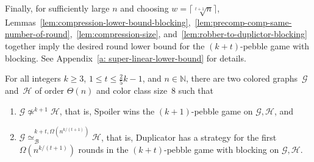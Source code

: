 \documentclass[a4paper,english, thm-restate]{lipics-v2021}
\newcommand{\comp}{\equiv}
\newcommand{\CFIsym}{\mathsf{CFI}}
\newcommand{\CFI}[1]{\CFIsym(#1)}
\newcommand{\compCFI}[2]{\CFI{#1}/_{#2}}
\newcommand{\nat}{\mathbb{N}}
\newcommand{\FF}{\mathbb{F}}
\newcommand{\graphG}{\mathcal{G}}
\newcommand{\graphH}{\mathcal{H}}
\newcommand{\edgeC}{E_{\mathcal{C}}}
\newcommand{\kbequivr}[2]{\simeq_{\mathcal{B}}^{#1,#2}}
\newcommand{\notkequiv}[1]{\not\simeq^{#1}}
\newcommand{\confORfull}[2]{#1}
\newcommand{\ifAppendix}[1]{#1}
\begin{document}
\noindent Finally, for sufficiently large $n$ and choosing $w = \lceil\sqrt[t+1]{n} \rceil$,
Lemmas~\ref{lem:compression-lower-bound-blocking},~\ref{lem:precomp-comp-same-number-of-round},~\ref{lem:compression-size}, and~\ref{lem:robber-to-duplictor-blocking}
together imply the desired round lower bound for 
the $(k+t)$-pebble game with blocking. \ifAppendix{See Appendix~\ref{a: super-linear-lower-bound} for details.}
%
\begin{theorem}
        \label{thm:compression-blocking-summary}
        For all integers $k\geq 3$, $1\leq t \leq \frac{2}{5}k-1$, and $n\in \nat$,
        there are  
        two colored graphs~$\graphG$ and~$\graphH$ of order $\Theta(n)$ and color class size~$8$
        such that
        \begin{enumerate}
                \item $\graphG \notkequiv{k+1} \graphH$, that is, Spoiler wins the $(k+1)$-pebble game on $\graphG, \graphH$,
                and 
                \item $\graphG \kbequivr{k+t}{\Omega(n^{k/(t+1)})} \graphH $,
                that is, Duplicator has a strategy for the first $\Omega(n^{k/(t+1)})$
                rounds in the $(k+t)$-pebble game with blocking on $\graphG, \graphH$.
        \end{enumerate}
\end{theorem}
\confORfull{}{
\begin{proof}
        Let $k \geq 3$, $1\leq t \leq  \frac{2}{5}k-1$, and $n \in \nat$.
        If $n$ is sufficiently large,
        for $w = \lceil\sqrt[t+1]{n} \rceil$ the required pairwise coprime numbers $p_1,\dots, p_k$ exist~\cite{DBLP:conf/focs/GroheLNS23}.
        Let $J = f(k) p_1\cdot\ldots \cdot p_k$
        and $\mathcal{C}$ be the $k\times J$ cylindrical grid.
        Also, let $\comp^t$ be the compression defined earlier with respect
        to $p_1,\dots, p_k$.
        By Lemma~\ref{lem:compression-lower-bound-blocking},
        the robber has a strategy for the first $\Omega( J) = \Omega(w^k) = \Omega(n^{k/(t+1)})$
        rounds in the compressed and blocking $(k+t)$-Cops and Robber game
        on $\mathcal{C}$ and $\comp^t$, when the robber is placed on the left or right end. 
        
        Now let $e$ be an edge in the left end,
        $f,g \, \colon \edgeC \to \FF_2$ only twist $e$,
        and set $\graphG :=\compCFI{\mathcal{C},f}{\comp^t}$ and $\graphH :=\compCFI{\mathcal{C},f}{\comp^t}$.
        By Lemmas~\ref{lem:precomp-comp-same-number-of-round}
        and~\ref{lem:robber-to-duplictor-blocking},
        Duplicator has a strategy for the first  $\Omega(n^{k/(t+1)})$
        rounds of the $(k+t)$-pebble game with blocking
        on $\graphG$ and $\graphH$.
        It is known that Spoiler wins the $(k+1)$-pebble game
        on CFI graphs over cylindrical grids and thus over the compressed ones
        by Lemma~\ref{lem:precomp-comp-same-number-of-round}.
        By Lemma~\ref{lem:compression-size},
        the graphs $\graphG$ and $\graphH$ have size $\Theta(n)$
        and are of color class size $8$.
\end{proof}}
\end{document}
